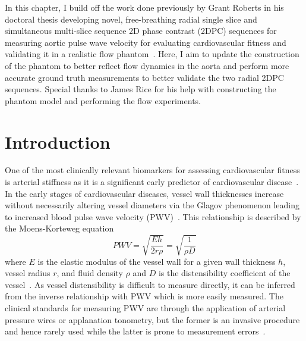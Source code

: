 In this chapter, I build off the work done previously by Grant Roberts in his doctoral thesis developing novel, free-breathing radial single slice and simultaneous multi-slice sequence 2D phase contrast (2DPC) sequences for measuring aortic pulse wave velocity for evaluating cardiovascular fitness and validating it in a realistic flow phantom~\cite{robertsAdvancingFunctionalAssessment2023}. Here, I aim to update the construction of the phantom to better reflect flow dynamics in the aorta and perform more accurate ground truth measurements to better validate the two radial 2DPC sequences. Special thanks to James Rice for his help with constructing the phantom model and performing the flow experiments.

\section{Introduction}\label{sec:phantom_intro}
One of the most clinically relevant biomarkers for assessing cardiovascular fitness is arterial stiffness as it is a significant early predictor of cardiovascular disease~\cite{cavalcanteAorticStiffness2011}. In the early stages of cardiovascular diseases, vessel wall thicknesses increase without necessarily altering vessel diameters via the Glagov phenomenon leading to increased blood pulse wave velocity (PWV)~\cite{wentlandReviewMRIbasedMeasurements2014}. This relationship is described by the Moens-Korteweg equation 
\begin{equation}
    PWV={\sqrt{\frac{E h}{2r\rho }}}=\sqrt{\frac{1}{\rho D}}
    \label{eq:moens-korteweg}
\end{equation}
where $E$ is the elastic modulus of the vessel wall for a given wall thickness $h$, vessel radius $r$, and fluid density $\rho$ and $D$ is the distensibility coefficient of the vessel~\cite{newmanValidityMoensKortewegEquation1978}. As vessel distensibility is difficult to measure directly, it can be inferred from the inverse relationship with PWV which is more easily measured. The clinical standards for measuring PWV are through the application of arterial pressure wires or applanation tonometry, but the former is an invasive procedure and hence rarely used while the latter is prone to measurement errors~\cite{avolioArterialBloodPressure2009,kimPulseWaveVelocity2019}. 

